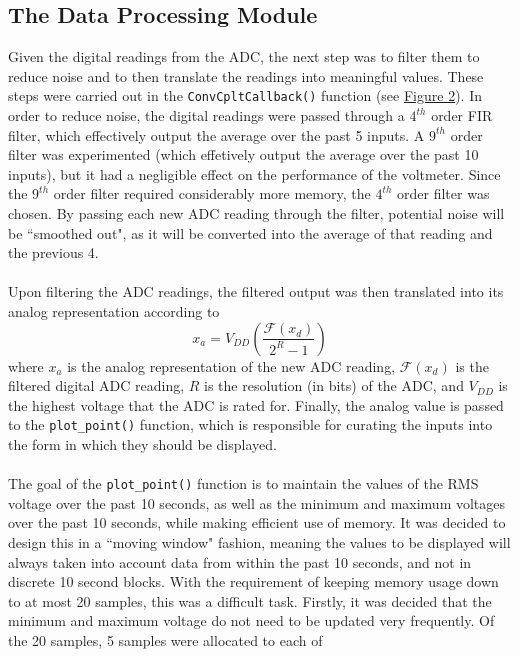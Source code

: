 \documentclass[12pt]{report}
\begin{document}
\subsection{The Data Processing Module}\label{dataproc}
Given the digital readings from the ADC, the next step was to filter them to reduce noise and to
then translate the readings into meaningful values. These steps were carried out in the
\texttt{ConvCpltCallback()} function (see \hyperref[adcflow]{Figure 2}). In order to reduce noise,
the digital readings
were passed through a $4^{th}$ order FIR filter, which effectively output the average over the past
5 inputs. A $9^{th}$ order filter was experimented (which effetively output the average over the
past 10 inputs), but it had a negligible effect on the performance of the voltmeter. Since the
$9^{th}$ order filter required considerably more memory, the $4^{th}$ order filter was chosen. By
passing each new ADC reading through the filter, potential noise will be ``smoothed out", as it will
be converted into the average of that reading and the previous 4.\\\\
Upon filtering the ADC readings, the filtered output was then translated into its analog
representation according to
\begin{equation}
	x_a = V_{DD}\left (\frac{\mathcal{F}(x_d)}{2^{R} -1}\right)
\end{equation}
where $x_a$ is the analog representation of the new ADC reading, $\mathcal{F}(x_d)$ is the filtered
digital ADC reading, $R$ is the resolution (in bits) of the ADC, and $V_{DD}$ is the highest voltage
that the ADC is rated for. Finally, the analog value is passed to the \texttt{plot\_point()}
function, which is responsible for curating the inputs into the form in which they should be
displayed.\\\\
The goal of the \texttt{plot\_point()} function is to maintain the values of the RMS voltage over
the past 10 seconds, as well as the minimum and maximum voltages over the past 10 seconds, while
making efficient use of memory. It was decided to design this in a ``moving window" fashion, meaning
the values to be displayed will always taken into account data from within the past 10 seconds, and
not in discrete 10 second blocks. With the requirement of keeping memory usage down to at most 20
samples, this was a difficult task. Firstly, it was decided that the minimum and maximum voltage do
not need to be updated very frequently. Of the 20 samples, 5 samples were allocated to each of
\end{document}
